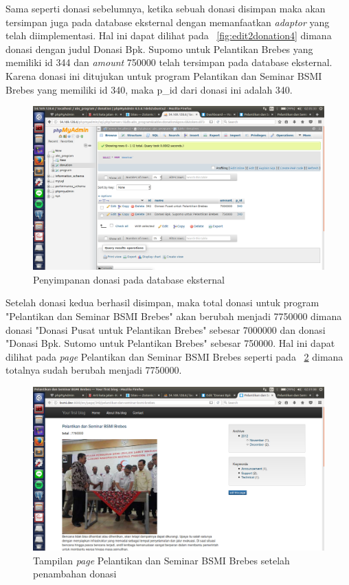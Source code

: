 Sama seperti donasi sebelumnya, ketika sebuah donasi disimpan maka akan tersimpan juga pada database eksternal dengan memanfaatkan \textit{adaptor} yang telah diimplementasi. Hal ini dapat dilihat pada \pic~\ref{fig:edit2donation4} dimana donasi dengan judul Donasi Bpk. Supomo untuk Pelantikan Brebes yang memiliki id 344 dan \textit{amount} 750000 telah tersimpan pada database eksternal. Karena donasi ini ditujukan untuk program Pelantikan dan Seminar BSMI Brebes yang memiliki id 340, maka p\_id dari donasi ini adalah 340.
\begin{figure}
	\centering
	\includegraphics[width=1\textwidth]
	{pics/18-dbdonation.png}
	\caption{Penyimpanan donasi pada database eksternal}
	\label{fig:dbdonation}
\end{figure}
\vspace{-0.3cm}

Setelah donasi kedua berhasil disimpan, maka total donasi untuk program "Pelantikan dan Seminar BSMI Brebes" akan berubah menjadi 7750000 dimana donasi "Donasi Pusat untuk Pelantikan Brebes" sebesar 7000000 dan donasi "Donasi Bpk. Sutomo untuk Pelantikan Brebes" sebesar 750000. Hal ini dapat dilihat pada \textit{page} Pelantikan dan Seminar BSMI Brebes seperti pada \pic~\ref{fig:viewprogram3} dimana totalnya sudah berubah menjadi 7750000.
\begin{figure}
	\centering
	\includegraphics[width=1\textwidth]
	{pics/19-viewProgram.png}
	\caption{Tampilan \textit{page} Pelantikan dan Seminar BSMI Brebes setelah penambahan donasi}
	\label{fig:viewprogram3}
\end{figure}
\vspace{-0.3cm}

